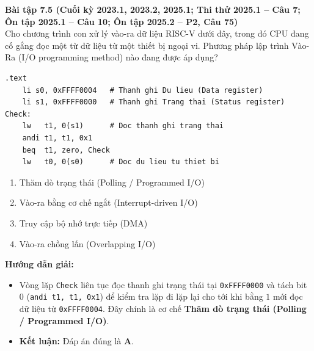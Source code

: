 \textbf{Bài tập 7.5 (Cuối kỳ 2023.1, 2023.2, 2025.1; Thi thử 2025.1 -- Câu 7; Ôn tập 2025.1 -- Câu 10; Ôn tập 2025.2 -- P2, Câu 75)}\\
Cho chương trình con xử lý vào-ra dữ liệu RISC-V dưới đây, trong đó CPU đang cố gắng đọc một từ dữ liệu từ một thiết bị ngoại vi. Phương pháp lập trình Vào-Ra (I/O programming method) nào đang được áp dụng?
\begin{lstlisting}
.text
    li s0, 0xFFFF0004   # Thanh ghi Du lieu (Data register)
    li s1, 0xFFFF0000   # Thanh ghi Trang thai (Status register)
Check:
    lw   t1, 0(s1)      # Doc thanh ghi trang thai
    andi t1, t1, 0x1
    beq  t1, zero, Check
    lw   t0, 0(s0)      # Doc du lieu tu thiet bi
\end{lstlisting}
\begin{enumerate}[label=\Alph*.]
    \item Thăm dò trạng thái (Polling / Programmed I/O)
    \item Vào-ra bằng cơ chế ngắt (Interrupt-driven I/O)
    \item Truy cập bộ nhớ trực tiếp (DMA)
    \item Vào-ra chồng lấn (Overlapping I/O)
\end{enumerate}
\textbf{Hướng dẫn giải:}
\begin{itemize}
    \item Vòng lặp \texttt{Check} liên tục đọc thanh ghi trạng thái tại \texttt{0xFFFF0000} và tách bit $0$ (\texttt{andi t1, t1, 0x1}) để kiểm tra lặp đi lặp lại cho tới khi bằng $1$ mới đọc dữ liệu từ \texttt{0xFFFF0004}. Đây chính là cơ chế \textbf{Thăm dò trạng thái (Polling / Programmed I/O)}.
    \item \textbf{Kết luận:} Đáp án đúng là \textbf{A}.
\end{itemize}

